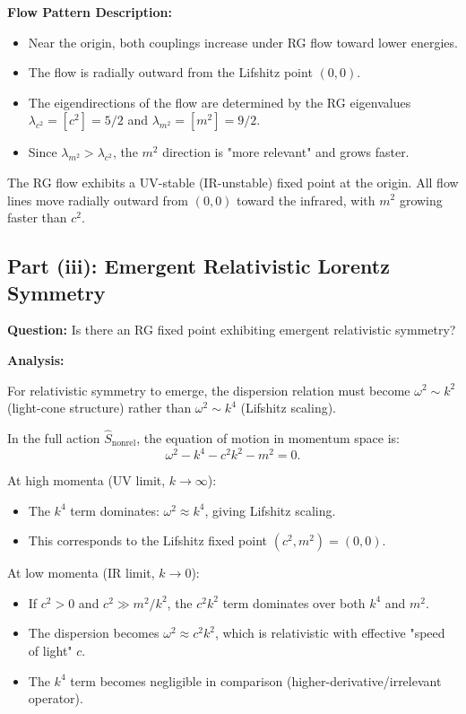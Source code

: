 \documentclass[11pt, a4paper]{article}
\newcommand{\be}{\begin{equation}}
\newcommand{\ee}{\end{equation}}
\begin{document}
\textbf{Flow Pattern Description:}
\begin{itemize}
    \item Near the origin, both couplings increase under RG flow toward lower energies.
    \item The flow is radially outward from the Lifshitz point $(0,0)$.
    \item The eigendirections of the flow are determined by the RG eigenvalues $\lambda_{c^2} = [c^2] = 5/2$ and $\lambda_{m^2} = [m^2] = 9/2$.
    \item Since $\lambda_{m^2} > \lambda_{c^2}$, the $m^2$ direction is "more relevant" and grows faster.
\end{itemize}

The RG flow exhibits a UV-stable (IR-unstable) fixed point at the origin. All flow lines move radially outward from $(0,0)$ toward the infrared, with $m^2$ growing faster than $c^2$.

\subsection{Part (iii): Emergent Relativistic Lorentz Symmetry}

\textbf{Question:} Is there an RG fixed point exhibiting emergent relativistic symmetry?

\textbf{Analysis:}

For relativistic symmetry to emerge, the dispersion relation must become $\omega^2 \sim k^2$ (light-cone structure) rather than $\omega^2 \sim k^4$ (Lifshitz scaling).

In the full action $\hat{S}_{\text{nonrel}}$, the equation of motion in momentum space is:
\be
\omega^2 - k^4 - c^2 k^2 - m^2 = 0.
\ee

At high momenta (UV limit, $k \to \infty$):
\begin{itemize}
    \item The $k^4$ term dominates: $\omega^2 \approx k^4$, giving Lifshitz scaling.
    \item This corresponds to the Lifshitz fixed point $(c^2, m^2) = (0,0)$.
\end{itemize}

At low momenta (IR limit, $k \to 0$):
\begin{itemize}
    \item If $c^2 > 0$ and $c^2 \gg m^2/k^2$, the $c^2 k^2$ term dominates over both $k^4$ and $m^2$.
    \item The dispersion becomes $\omega^2 \approx c^2 k^2$, which is relativistic with effective "speed of light" $c$.
    \item The $k^4$ term becomes negligible in comparison (higher-derivative/irrelevant operator).
\end{itemize}
\end{document}
